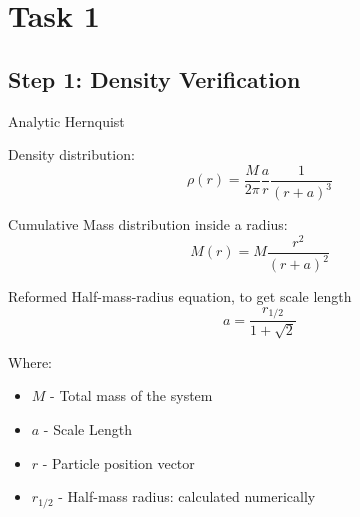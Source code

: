 \section{Task 1}
\subsection{Step 1: Density Verification}

\begin{frame}{Analytic Hernquist}

	Density distribution:
	\begin{equation}
		\rho(r) = \frac{M}{2\pi}\frac{a}{r}\frac{1}{(r+a)^3}
		\label{eq:density-distribution}
	\end{equation}

	Cumulative Mass distribution inside a radius:
	\begin{equation}
		M(r) = M \frac{r^2}{(r+a)^2}
		\label{eq:cumulative-mass-distribution}
	\end{equation}

	Reformed Half-mass-radius equation, to get scale length
	\begin{equation}
		a = \frac{r_{1/2}}{1+\sqrt 2}
		\label{eq:scaling length}
	\end{equation}

	{\footnotesize Where:
	\begin{itemize}
		\item $M$  - Total mass of the system
		\item $a$ - Scale Length
		\item $r$ - Particle position vector
		\item $r_{1/2}$ - Half-mass radius: calculated numerically
	\end{itemize}}
\end{frame}

